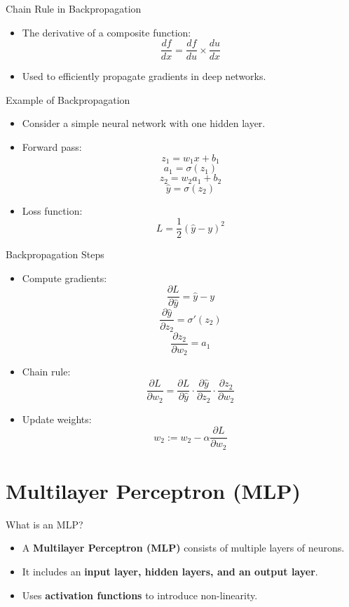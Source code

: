 \documentclass{beamer}
\begin{document}
\begin{frame}{Chain Rule in Backpropagation}
    \begin{itemize}
        \item The derivative of a composite function:
        \[
        \frac{df}{dx} = \frac{df}{du} \times \frac{du}{dx}
        \]
        \item Used to efficiently propagate gradients in deep networks.
    \end{itemize}
\end{frame}

\begin{frame}{Example of Backpropagation}
    \begin{itemize}
        \item Consider a simple neural network with one hidden layer.
        \item Forward pass:
        \[
        z_1 = w_1 x + b_1
        \]
        \[
        a_1 = \sigma(z_1)
        \]
        \[
        z_2 = w_2 a_1 + b_2
        \]
        \[
        \hat{y} = \sigma(z_2)
        \]
        \item Loss function:
        \[
        L = \frac{1}{2} (\hat{y} - y)^2
        \]
    \end{itemize}
\end{frame}

\begin{frame}{Backpropagation Steps}
    \begin{itemize}
        \item Compute gradients:
        \[
        \frac{\partial L}{\partial \hat{y}} = \hat{y} - y
        \]
        \[
        \frac{\partial \hat{y}}{\partial z_2} = \sigma'(z_2)
        \]
        \[
        \frac{\partial z_2}{\partial w_2} = a_1
        \]
        \item Chain rule:
        \[
        \frac{\partial L}{\partial w_2} = \frac{\partial L}{\partial \hat{y}} \cdot \frac{\partial \hat{y}}{\partial z_2} \cdot \frac{\partial z_2}{\partial w_2}
        \]
        \item Update weights:
        \[
        w_2 := w_2 - \alpha \frac{\partial L}{\partial w_2}
        \]
    \end{itemize}
\end{frame}

\section{Multilayer Perceptron (MLP)}
\begin{frame}{What is an MLP?}
    \begin{itemize}
        \item A \textbf{Multilayer Perceptron (MLP)} consists of multiple layers of neurons.
        \item It includes an \textbf{input layer, hidden layers, and an output layer}.
        \item Uses \textbf{activation functions} to introduce non-linearity.
    \end{itemize}
\end{frame}
\end{document}
